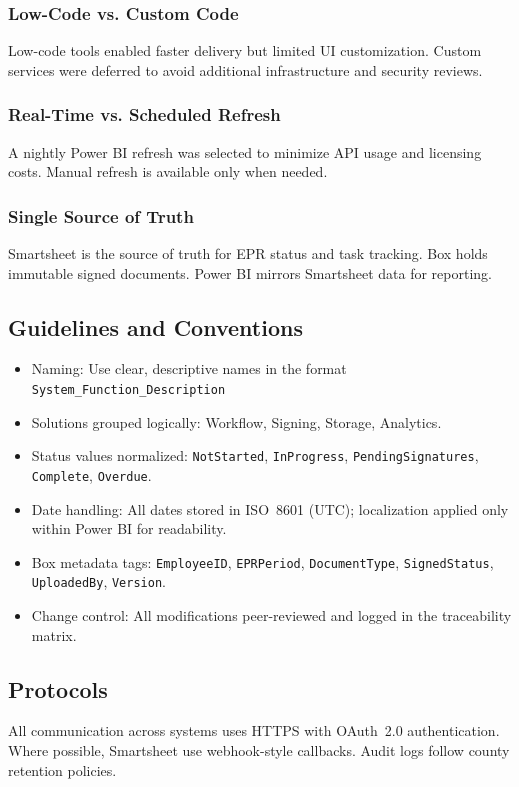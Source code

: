 \documentclass[12pt]{article}
\def\textbf#1{#1}%
\begin{document}
\subsubsection{Low-Code vs. Custom Code}
Low-code tools enabled faster delivery but limited UI customization. Custom services were
deferred to avoid additional infrastructure and security reviews.

\subsubsection{Real-Time vs. Scheduled Refresh}
A nightly Power BI refresh was selected to minimize API usage and licensing costs. Manual
refresh is available only when needed.

\subsubsection{Single Source of Truth}
Smartsheet is the source of truth for EPR status and task tracking. Box holds immutable signed
documents. Power BI mirrors Smartsheet data for reporting.

\subsection{Guidelines and Conventions}
\begin{itemize}[nosep]
  \item \textbf{Naming:} Use clear, descriptive names in the format 
        \texttt{System\_Function\_Description}
  \item \textbf{Solutions grouped logically:} Workflow, Signing, Storage, Analytics.
  \item \textbf{Status values normalized:} 
        \texttt{NotStarted}, \texttt{InProgress}, \texttt{PendingSignatures}, 
        \texttt{Complete}, \texttt{Overdue}.
  \item \textbf{Date handling:} All dates stored in ISO~8601 (UTC); localization applied only
        within Power BI for readability.
  \item \textbf{Box metadata tags:} 
        \texttt{EmployeeID}, \texttt{EPRPeriod}, \texttt{DocumentType}, 
        \texttt{SignedStatus}, \texttt{UploadedBy}, \texttt{Version}.
  \item \textbf{Change control:} All modifications peer-reviewed and logged in the
        traceability matrix.
\end{itemize}

\subsection{Protocols}
All communication across systems uses HTTPS with OAuth~2.0 authentication. Where possible,
Smartsheet use webhook-style callbacks. Audit logs follow county retention
policies.
\end{document}
